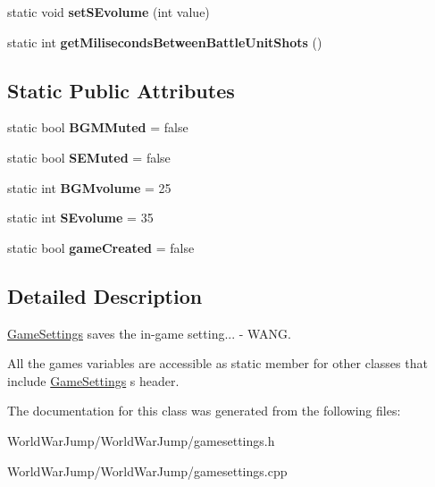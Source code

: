 \begin{DoxyCompactItemize}
\item 
static void {\bfseries set\+S\+Evolume} (int value)\hypertarget{class_game_settings_a44db62397d2b3439492c0aea84a16c32}{}\label{class_game_settings_a44db62397d2b3439492c0aea84a16c32}

\item 
static int {\bfseries get\+Miliseconds\+Between\+Battle\+Unit\+Shots} ()\hypertarget{class_game_settings_ac915c3001cebddf35be247d5624b6dce}{}\label{class_game_settings_ac915c3001cebddf35be247d5624b6dce}

\end{DoxyCompactItemize}
\subsection*{Static Public Attributes}
\begin{DoxyCompactItemize}
\item 
static bool {\bfseries B\+G\+M\+Muted} = false\hypertarget{class_game_settings_a87e3bb0896d1bb44e7797df275b1f1ab}{}\label{class_game_settings_a87e3bb0896d1bb44e7797df275b1f1ab}

\item 
static bool {\bfseries S\+E\+Muted} = false\hypertarget{class_game_settings_a6945f286363960c2331bbcb4ec758e43}{}\label{class_game_settings_a6945f286363960c2331bbcb4ec758e43}

\item 
static int {\bfseries B\+G\+Mvolume} = 25\hypertarget{class_game_settings_a5fc95f4ae14129aec1b0bd02996c22df}{}\label{class_game_settings_a5fc95f4ae14129aec1b0bd02996c22df}

\item 
static int {\bfseries S\+Evolume} = 35\hypertarget{class_game_settings_a4077fc804506698a19d5f1c4878c95ff}{}\label{class_game_settings_a4077fc804506698a19d5f1c4878c95ff}

\item 
static bool {\bfseries game\+Created} = false\hypertarget{class_game_settings_a8e4eaa1eef1419e3d25660d57ee51b7c}{}\label{class_game_settings_a8e4eaa1eef1419e3d25660d57ee51b7c}

\end{DoxyCompactItemize}


\subsection{Detailed Description}
\hyperlink{class_game_settings}{Game\+Settings} saves the in-\/game setting... -\/ W\+A\+NG. 

All the game\textquotesingle{}s variables are accessible as static member for other classes that include \hyperlink{class_game_settings}{Game\+Settings} \textquotesingle{}s header. 

The documentation for this class was generated from the following files\+:\begin{DoxyCompactItemize}
\item 
World\+War\+Jump/\+World\+War\+Jump/gamesettings.\+h\item 
World\+War\+Jump/\+World\+War\+Jump/gamesettings.\+cpp\end{DoxyCompactItemize}
